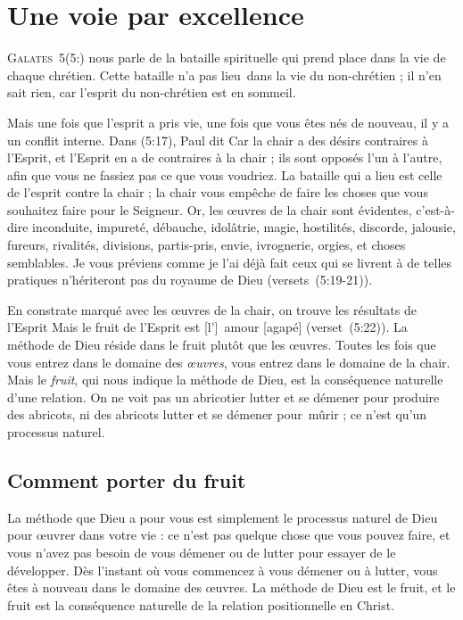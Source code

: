 \chapter{Une voie par excellence}

\lettrine{G}{alates~5}(5:) nous parle de
 la bataille spirituelle
 qui prend place dans la vie de chaque chrétien.
 Cette bataille n'a pas lieu~dans la vie du non-chrétien ;
 il n'en sait rien, car l'esprit du non-chrétien est en sommeil.

Mais une fois que l'esprit a pris vie, une fois que vous êtes nés de nouveau,
 il y a un conflit interne. Dans (5:17), Paul dit\frcolon{}
 \Og Car la chair a des désirs contraires à l'Esprit,
 et l'Esprit en a de contraires à la chair ; ils sont opposés l'un à l'autre,
 afin que vous ne fassiez pas ce que vous voudriez. \Fg{}
 La bataille qui a lieu est celle de l'esprit contre la chair ;
 la chair vous empêche de faire les choses que vous souhaitez
 faire pour le Seigneur.
 \Og Or, les œuvres de la chair sont évidentes, c'est-à-dire inconduite,
 impureté, débauche, idolâtrie, magie, hostilités, discorde, jalousie,
 fureurs, rivalités, divisions, partis-pris, envie, ivrognerie, orgies,
 et choses semblables. Je vous préviens comme je l'ai déjà fait\frcolon{}
 ceux qui se livrent à de telles pratiques n'hériteront pas
 du royaume de Dieu \Fg{} (versets~(5:19-21)).

En constrate marqué avec les œuvres de la chair, on trouve les résultats
 de l'Esprit\frcolon{} \Og Mais le fruit de l'Esprit est [l']~amour [agapé] \Fg{}
 (verset~(5:22)). La méthode de Dieu réside dans le fruit
 plutôt que les œuvres. Toutes les fois que vous entrez dans le domaine
 des \emph{œuvres}, vous entrez dans le domaine de la chair.
 Mais le \emph{fruit}, qui nous indique la méthode de Dieu, est la conséquence
 naturelle d'une relation. On ne voit pas un abricotier lutter
 et se démener pour produire des abricots, ni des abricots lutter
 et se démener pour~mûrir ; ce n'est qu'un processus naturel.


\section{Comment porter du fruit}

La méthode que Dieu a pour vous est simplement le processus naturel
 de Dieu pour œuvrer dans votre vie : ce n'est pas quelque chose
 que vous pouvez faire, et vous n'avez pas besoin de vous démener
 ou de lutter pour essayer de le développer.
 Dès l'instant où vous commencez à vous démener ou à lutter,
 vous êtes à nouveau dans le domaine des œuvres.
 La méthode de Dieu est le fruit, et le fruit est la conséquence
 naturelle de la relation positionnelle en Christ.

